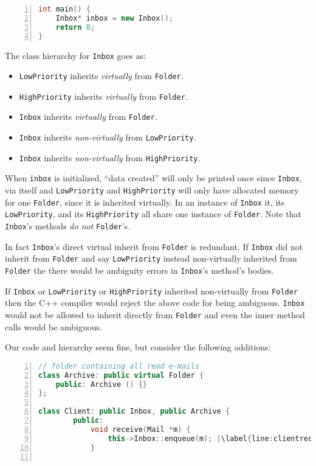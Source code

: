 \documentclass{article}
\begin{document}
\begin{example}
\begin{lstlisting}[language=C++, numbers=left, escapechar=|]
int main() {
    Inbox* inbox = new Inbox();
    return 0;
}
\end{lstlisting}
  The class hierarchy for \texttt{Inbox} goes as:
  \begin{itemize}
  \item \texttt{LowPriority} inherits \textit{virtually} from \texttt{Folder}.
  \item \texttt{HighPriority} inherits \textit{virtually} from \texttt{Folder}.
  \item \texttt{Inbox} inherits \textit{virtually} from \texttt{Folder}.
  \item \texttt{Inbox} inherits \textit{non-virtually} from \texttt{LowPriority}.
  \item \texttt{Inbox} inherits \textit{non-virtually} from \texttt{HighPriority}.
  \end{itemize}
  When \texttt{inbox} is initialized, ``data created'' will only be printed once since \texttt{Inbox}, via itself and \texttt{LowPriority} and \texttt{HighPriority} will only have allocated memory for one \texttt{Folder}, since it is inherited virtually.
  In an instance of \texttt{Inbox} it, its \texttt{LowPriority}, and its \texttt{HighPriority} all share one instance of \texttt{Folder}.
  Note that \texttt{Inbox}'s methods \textit{do not \override{}} \texttt{Folder}'s.


  In fact \texttt{Inbox}'s direct virtual inherit from \texttt{Folder} is redundant.
  If \texttt{Inbox} did not inherit from \texttt{Folder} and say \texttt{LowPriority} instead non-virtually inherited from \texttt{Folder} the there would be ambiguity errors in \texttt{Inbox}'s method's bodies.


  If \texttt{Inbox} or \texttt{LowPriority} or \texttt{HighPriority} inherited non-virtually from \texttt{Folder} then the C++ compiler would reject the above code for being ambiguous.
  \texttt{Inbox} would not be allowed to inherit directly from \texttt{Folder} and even the inner method calls would be ambiguous.


  Our code and hierarchy seem fine, but consider the following additions:
\begin{lstlisting}[language=C++, numbers=left, escapechar=|]
// folder containing all read e-mails
class Archive: public virtual Folder {
    public: Archive () {}
};

class Client: public Inbox, public Archive {
        public:
            void receive(Mail *m) {
                this->Inbox::enqueue(m); |\label{line:clientreceive}|
            }
            

\end{lstlisting}
\end{example}
\end{document}
